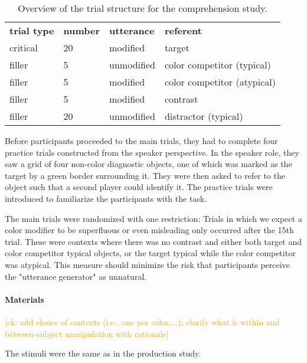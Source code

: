 \documentclass[a4paper,man,floatsintext,natbib,donotrepeattitle]{apa6}
\newcommand{\ek}[1]{\textcolor{Orange}{[ek: #1]}}
\begin{document}
\begin{table}[]
	\begin{tabular}{llll}
	\textbf{trial type} & \textbf{number} & \textbf{utterance} & \textbf{referent}           \\
	critical            & 20              & modified           & target                      \\
	filler              & 5               & unmodified         & color competitor (typical)  \\
	filler              & 5               & modified           & color competitor (atypical) \\
	filler              & 5               & modified           & contrast                    \\
	filler              & 20              & unmodified         & distractor (typical)       
	\end{tabular}
	\vspace{2mm}
	\caption{Overview of the trial structure for the comprehension study.}
	\label{tab:trialstructure}
\end{table}

Before participants proceeded to the main trials, they had to complete four practice trials constructed from the speaker perspective. In the speaker role, they saw a grid of four non-color diagnostic objects, one of which was marked as the target by a green border surrounding it. They were then asked to refer to the object such that a second player could identify it. The practice trials were introduced to familiarize the participants with the task.

The main trials were randomized with one restriction: Trials in which we expect a color modifier to be superfluous or even misleading only occurred after the 15th trial. These were contexts where there was no contrast and either both target and color competitor typical objects, or the target typical while the color competitor was atypical. This measure should minimize the risk that participants perceive the "utterance generator" as unnatural.

\paragraph{Materials}

\ek{add choice of contexts (i.e., one per color,...); clarify what is within and between-subject manipulation with rationale}

The stimuli were the same as in the production study.
\end{document}
